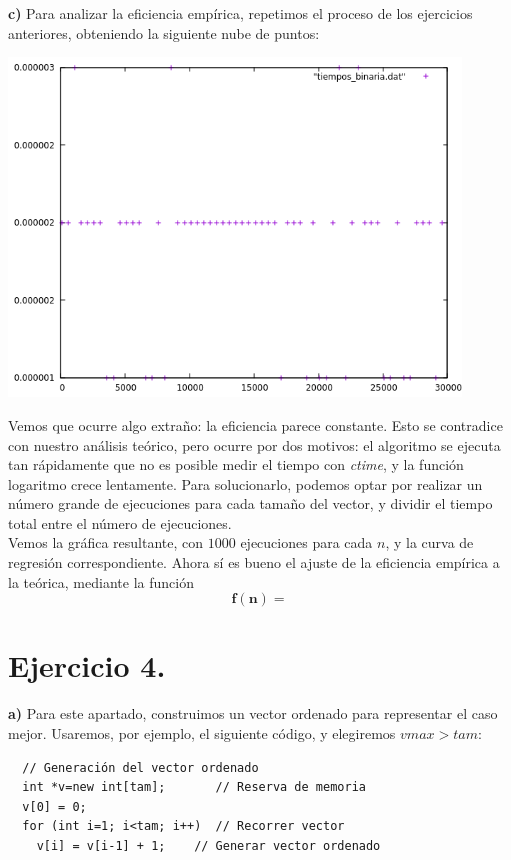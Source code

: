 \documentclass[11pt,a4paper]{article}
\newcommand{\bm}[1]{\boldsymbol{#1}}
\begin{document}
\textbf{c)} Para analizar la eficiencia empírica, repetimos el proceso de los ejercicios anteriores, obteniendo la siguiente nube de puntos:

\begin{center}
\includegraphics[width=12cm]{img/tiempo_binaria.png}
\end{center}

Vemos que ocurre algo extraño: la eficiencia parece constante. Esto se contradice con nuestro análisis teórico, pero ocurre por dos motivos: el algoritmo se ejecuta tan rápidamente que no es posible medir el tiempo con \textit{ctime}, y la función logaritmo crece lentamente. Para solucionarlo, podemos optar por realizar un número grande de ejecuciones para cada tamaño del vector, y dividir el tiempo total entre el número de ejecuciones.\\

Vemos la gráfica resultante, con $1000$ ejecuciones para cada $n$, y la curva de regresión correspondiente. Ahora sí es bueno el ajuste de la eficiencia empírica a la teórica, mediante la función $$\bm{f(n) = }$$


\section*{Ejercicio 4.}

\textbf{a)} Para este apartado, construimos un vector ordenado para representar el caso mejor. Usaremos, por ejemplo, el siguiente código, y elegiremos $vmax > tam$:

\begin{lstlisting}
  // Generación del vector ordenado
  int *v=new int[tam];       // Reserva de memoria
  v[0] = 0;
  for (int i=1; i<tam; i++)  // Recorrer vector
    v[i] = v[i-1] + 1;    // Generar vector ordenado
\end{lstlisting}
\end{document}
